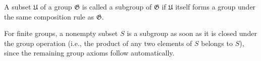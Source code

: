 A subset $\mathfrak{U}$ of a group $\mathfrak{G}$ is called a subgroup of $\mathfrak{G}$ if $\mathfrak{U}$ itself forms a group under the same composition rule as $\mathfrak{G}$.

For finite groups, a nonempty subset $S$ is a subgroup as soon as it is closed under the group operation (i.e., the product of any two elements of $S$ belongs to $S$), since the remaining group axioms follow automatically.
